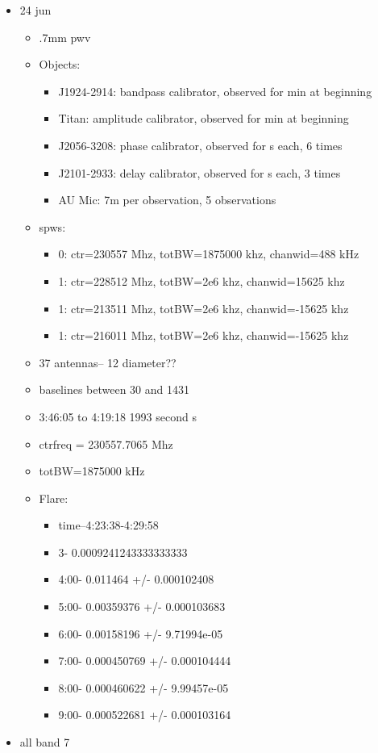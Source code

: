 \documentclass[a4paper]{tufte-handout}
\begin{document}
\begin{itemize}
	\item 24 jun
	      \begin{itemize}
	      	\item \abt .7mm pwv
	      	\item Objects:
	      	      \begin{itemize}
	      	      	\item J1924-2914: bandpass calibrator, observed for  min at beginning
	      	      	\item Titan: amplitude calibrator, observed for  min at beginning
	      	      	\item J2056-3208: phase calibrator, observed for  s each, 6 times
	      	      	\item J2101-2933: delay calibrator, observed for  s each, 3 times
	      	      	\item AU Mic: \abt 7m per observation, 5 observations
	      	      \end{itemize}
	      	\item spws:
	      	      \begin{itemize}
	      	      	\item 0: ctr=230557 Mhz, totBW=1875000 khz, chanwid=488 kHz
	      	      	\item 1: ctr=228512 Mhz, totBW=2e6 khz, chanwid=15625 khz
	      	      	\item 1: ctr=213511 Mhz, totBW=2e6 khz, chanwid=-15625 khz
	      	      	\item 1: ctr=216011 Mhz, totBW=2e6 khz, chanwid=-15625 khz
	      	      \end{itemize}
	      	\item 37 antennas-- 12 diameter??
	      	\item baselines between 30 and 1431
	      	\item 3:46:05 to 4:19:18 1993 second  s
	      	\item ctrfreq = 230557.7065 Mhz
	      	\item totBW=1875000 kHz
          \item Flare:
            \begin{itemize}
              \item time--4:23:38-4:29:58
              \item 3- 0.0009241243333333333
              \item 4:00- 0.011464 +/- 0.000102408
              \item 5:00- 0.00359376 +/- 0.000103683
              \item 6:00- 0.00158196 +/- 9.71994e-05
              \item 7:00- 0.000450769 +/- 0.000104444
              \item 8:00- 0.000460622 +/- 9.99457e-05
              \item 9:00- 0.000522681 +/- 0.000103164
            \end{itemize}
	      \end{itemize}

	\item all band 7

\end{itemize}
\end{document}
